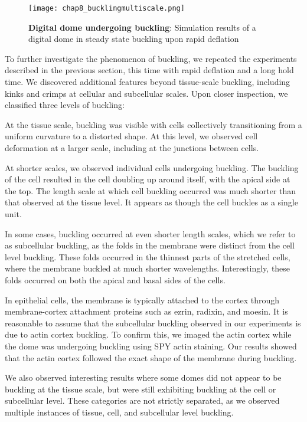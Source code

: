 \begin{figure}
	\centering
	\texttt{[image: chap8\_bucklingmultiscale.png]}
	\caption{\label{fig_8_4} \textbf{Digital dome undergoing buckling}: Simulation results of a digital dome in steady state buckling upon rapid deflation
	}
\end{figure}

To further investigate the phenomenon of buckling, we repeated the
experiments described in the previous section, this time with rapid
deflation and a long hold time. We discovered additional features beyond
tissue-scale buckling, including kinks and crimps at cellular and
subcellular scales. Upon closer inspection, we classified three levels
of buckling:

At the tissue scale, buckling was visible with cells collectively
transitioning from a uniform curvature to a distorted shape. At this
level, we observed cell deformation at a larger scale, including at the
junctions between cells.

At shorter scales, we observed individual cells undergoing buckling. The
buckling of the cell resulted in the cell doubling up around itself,
with the apical side at the top. The length scale at which cell buckling
occurred was much shorter than that observed at the tissue level. It
appears as though the cell buckles as a single unit.

In some cases, buckling occurred at even shorter length scales, which we
refer to as subcellular buckling, as the folds in the membrane were
distinct from the cell level buckling. These folds occurred in the
thinnest parts of the stretched cells, where the membrane buckled at
much shorter wavelengths. Interestingly, these folds occurred on both
the apical and basal sides of the cells.

In epithelial cells, the membrane is typically attached to the cortex
through membrane-cortex attachment proteins such as ezrin, radixin, and
moesin. It is reasonable to assume that the subcellular buckling
observed in our experiments is due to actin cortex buckling. To confirm
this, we imaged the actin cortex while the dome was undergoing buckling
using SPY actin staining. Our results showed that the actin cortex
followed the exact shape of the membrane during buckling.

We also observed interesting results where some domes did not appear to
be buckling at the tissue scale, but were still exhibiting buckling at
the cell or subcellular level. These categories are not strictly
separated, as we observed multiple instances of tissue, cell, and
subcellular level buckling.

